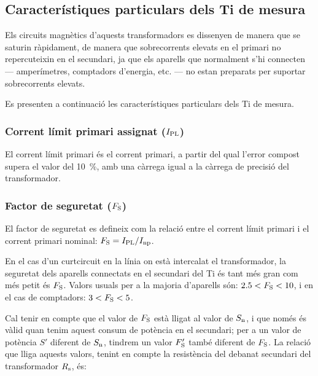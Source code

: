 \subsection{Característiques particulars dels Ti de mesura}

Els circuits magnètics d'aquests transformadors es dissenyen de
manera que se saturin ràpidament, de manera que
sobrecorrents elevats en el primari  no repercuteixin en el secundari,
ja que els aparells que normalment s'hi connecten --- amperímetres,
comptadors d'energia, etc. --- no estan preparats per suportar
sobrecorrents elevats.

Es presenten a continuació les característiques particulars dels Ti
de mesura.

\subsubsection{Corrent límit primari  assignat ($I_\mathrm{PL}$)}

El corrent  límit primari
és el corrent primari, a partir del qual l'error compost supera el valor del \qty{10}{\percent}, amb una càrrega igual a la càrrega de
precisió del transformador.

\subsubsection{Factor de seguretat ($F_\mathrm{S}$) }

 El factor de seguretat
es defineix com la relació entre el corrent límit primari
i el corrent primari nominal: $F_\mathrm{S} = I_\mathrm{PL} / I_\mathrm{np}$.

En el cas d'un curtcircuit en la línia on està intercalat el
transformador, la seguretat dels aparells connectats en el secundari
del Ti és tant més gran com més petit és  $F_\mathrm{S}$. Valors usuals
per a la majoria d'aparells són:  $\num{2,5}<F_\mathrm{S}<10$, i en el cas de comptadors: $3<F_\mathrm{S}<5$.

Cal tenir en compte que el valor de $F_\mathrm{S}$ està lligat
 al valor de $S_\mathrm{n}$, i que només és vàlid
quan tenim aquest consum de  potència en el secundari; per a un
valor de potència $S'$ diferent de $S_\mathrm{n}$, tindrem un valor
$F'_\mathrm{S}$ també diferent de  $F_\mathrm{S}$. La relació que
lliga aquests valors, tenint en compte la resistència del debanat
secundari del transformador  $R_\mathrm{s}$, és:

